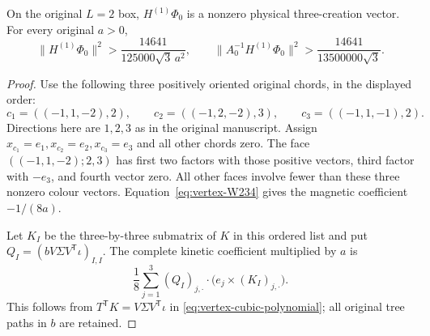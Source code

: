 \begin{theorem}\label{thm:vertex-nonzero}
On the original $L=2$ box, $H^{(1)}\Phi_0$ is a nonzero physical
three-creation vector. For every original $a>0$,
\begin{equation}\label{eq:vertex-lower-bounds}
 \|H^{(1)}\Phi_0\|^2>
              \frac{14641}{125000\sqrt3\,a^2},\qquad
 \|A_0^{-1}H^{(1)}\Phi_0\|^2>
              \frac{14641}{13500000\sqrt3}.
\end{equation}
\end{theorem}
\begin{proof}
Use the following three positively oriented original chords, in the
displayed order:
\[
 c_1=((-1,1,-2),2),\qquad c_2=((-1,2,-2),3),\qquad
 c_3=((-1,1,-1),2).
\]
Directions here are $1,2,3$ as in the original manuscript. Assign
$x_{c_1}=e_1,x_{c_2}=e_2,x_{c_3}=e_3$ and all other chords zero.
The face $((-1,1,-2);2,3)$ has first two factors with those positive
vectors, third factor with $-e_3$, and fourth vector zero. All other
faces involve fewer than these three nonzero colour vectors.
Equation~\eqref{eq:vertex-W234} gives the magnetic coefficient
$-1/(8a)$.

Let $K_I$ be the three-by-three submatrix of $K$ in this ordered
list and put $Q_I=(bV\Sigma V^{\mathsf T}\iota)_{I,I}$.
The complete kinetic coefficient multiplied by $a$ is
\begin{equation}\label{eq:vertex-certificate-contraction}
 \frac18\sum_{j=1}^3(Q_I)_{j,\cdot}
                   \cdot\bigl(e_j\times(K_I)_{j,\cdot}\bigr).
\end{equation}
This follows from $T^{\mathsf T}K=V\Sigma V^{\mathsf T}\iota$
in \eqref{eq:vertex-cubic-polynomial}; all original tree paths in
$b$ are retained.


\end{proof}
